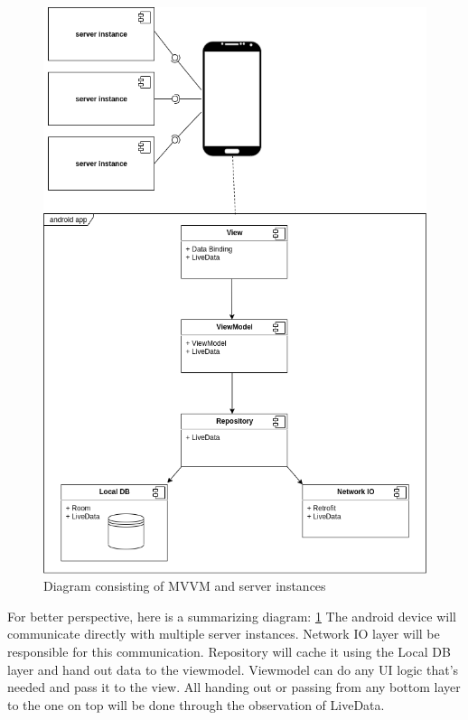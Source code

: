 \begin{figure}\centering
	\includegraphics[width=1\textwidth]{pics/bc-architecture.png}
	\caption[Architecture]{Diagram consisting of MVVM and server instances}\label{fig:architecture}
\end{figure}

For better perspective, here is a summarizing diagram: \ref{fig:architecture}
The android device will communicate directly with multiple server instances. Network IO layer will be responsible for this communication. Repository will cache it using the Local DB layer and hand out data to the viewmodel. Viewmodel can do any UI logic that's needed and pass it to the view. All handing out or passing from any bottom layer to the one on top will be done through the observation of LiveData.